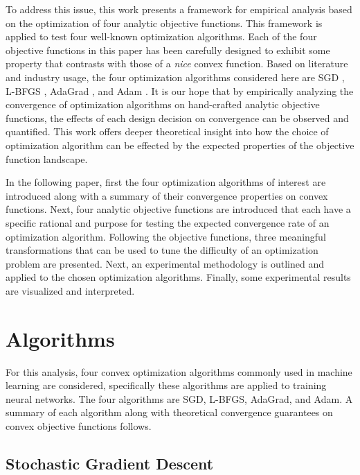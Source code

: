 \documentclass[conference]{ieeeconf}  %
\begin{document}
To address this issue, this work presents a framework for empirical
analysis based on the optimization of four analytic objective
functions. This framework is applied to test four well-known
optimization algorithms.  Each of the four objective functions in this
paper has been carefully designed to exhibit some property that
contrasts with those of a \textit{nice} convex function.  Based on
literature and industry usage, the four optimization algorithms
considered here are SGD \cite{nemirovski2009robust}, L-BFGS
\cite{nocedal1980updating,liu1989limited}, AdaGrad
\cite{duchi2013proximal}, and Adam \cite{kingma2014adam}.  It is our
hope that by empirically analyzing the convergence of optimization
algorithms on hand-crafted analytic objective functions, the effects
of each design decision on convergence can be observed and quantified.
This work offers deeper theoretical insight into how the choice of
optimization algorithm can be effected by the expected properties of
the objective function landscape.

In the following paper, first the four optimization algorithms of
interest are introduced along with a summary of their convergence
properties on convex functions.  Next, four analytic objective
functions are introduced that each have a specific rational and
purpose for testing the expected convergence rate of an optimization
algorithm. Following the objective functions, three meaningful
transformations that can be used to tune the difficulty of an
optimization problem are presented. Next, an experimental methodology
is outlined and applied to the chosen optimization algorithms.
Finally, some experimental results are visualized and interpreted.

\section{Algorithms}
\label{sec:algorithms}

For this analysis, four convex optimization algorithms commonly used
in machine learning are considered, specifically these algorithms are
applied to training neural networks. The four algorithms are SGD,
L-BFGS, AdaGrad, and Adam. A summary of each algorithm along with
theoretical convergence guarantees on convex objective functions
follows.

\subsection{Stochastic Gradient Descent}
\end{document}
